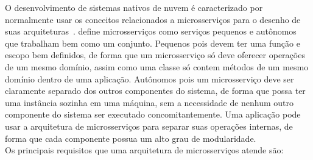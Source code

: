 O desenvolvimento de sistemas nativos de nuvem é caracterizado por normalmente usar os conceitos relacionados a microsserviços para o desenho de suas arquiteturas~\citep{garrison2017cloud}. %
 \cite{Newman:2015:BM:2904388} define microsserviços como serviços pequenos e autônomos que trabalham bem como um conjunto. Pequenos pois devem ter uma função e escopo bem definidos, de forma que um microsserviço só deve oferecer operações de um mesmo domínio, assim como uma classe só contem métodos de um mesmo domínio dentro de uma aplicação. Autônomos pois um microsserviço deve ser claramente separado dos outros componentes do sistema, de forma que possa ter uma instância sozinha em uma máquina, sem a necessidade de nenhum outro componente do sistema ser executado concomitantemente. Uma aplicação pode usar a arquitetura de microsserviços para separar suas operações internas, de forma que cada componente possua um alto grau de modularidade. \\
Os principais requisitos que uma arquitetura de microsserviços atende são:
